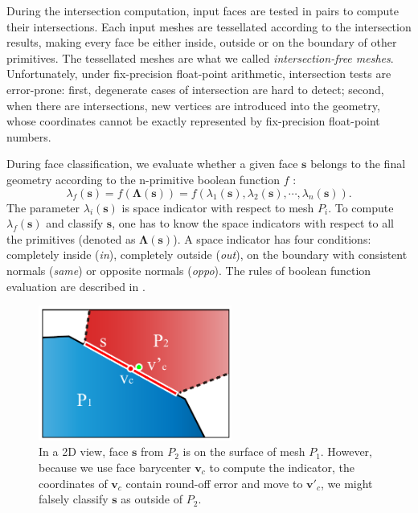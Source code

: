 \documentclass[10pt,journal,compsoc]{IEEEtran}
\begin{document}
During the intersection computation, input faces are tested in pairs to compute their intersections. Each input meshes are tessellated according to the intersection results, making every face be either inside, outside or on the boundary of other primitives. The tessellated meshes are what we called \emph{intersection-free meshes}. Unfortunately, under fix-precision float-point arithmetic, intersection tests are error-prone: first, degenerate cases of intersection are hard to detect; second, when there are intersections, new vertices are introduced into the geometry, whose coordinates cannot be exactly represented by fix-precision float-point numbers.

During face classification, we evaluate whether a given face $\bm{s}$ belongs to the final geometry according to the n-primitive boolean function $f$ :
\begin{equation}
\lambda_f(\bm{s}) = f(\boldsymbol{\Lambda}(\bm{s})) = f(\lambda_1(\bm{s}), \lambda_2(\bm{s}), \cdots, \lambda_n(\bm{s})).
\end{equation}
The parameter $\lambda_i(\bm{s})$ is space indicator with respect to mesh $P_i$. To compute $\lambda_f(\bm{s})$ and classify $\bm{s}$, one has to know the space indicators with respect to all the primitives (denoted as $\boldsymbol{\Lambda}(\bm{s})$). A space indicator has four conditions: completely inside (\emph{in}), completely outside (\emph{out}), on the boundary with consistent normals (\emph{same}) or opposite normals (\emph{oppo}). The rules of boolean function evaluation are described in \cite{douze2015quickcsg,feito2013fast}.

\begin{figure}[t]
\centering
\includegraphics[width=2.5in]{falseclass}
\caption{In a 2D view, face $\bm{s}$ from $P_2$ is on the surface of mesh $P_1$. However, because we use face barycenter $\bm{v}_c$ to compute the indicator, the coordinates of $\bm{v}_c$ contain round-off error and move to $\bm{v}'_c$, we might falsely classify $\bm{s}$ as outside of $P_2$.}
\label{fig:falseclass}
\end{figure}
\end{document}
